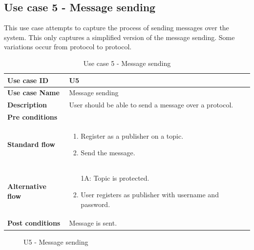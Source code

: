 \subsection{Use case 5 - Message sending}
\label{subsec:requirements_engineering-use_cases-message_sending}

This use case attempts to capture the process of sending messages over the system. This only captures a simplified version of the message sending. Some variations occur from protocol to protocol.

\begin{table}[ht!]
\centering
\begin{tabular}{|l|p{5cm}|}
\hline
\textbf{Use case ID} & U5 \\ \hline
\textbf{Use case Name} & Message sending \\ \hline
\textbf{Description} & User should be able to send a message over a protocol.  \\ \hline
\textbf{Pre conditions} &  \\ \hline
\textbf{Standard flow} & \begin{enumerate}
\item Register as a publisher on a topic.
\item Send the message.
\end{enumerate} \\ \hline
\textbf{Alternative flow} & \begin{enumerate}
\item [1A:] Topic is protected.
\item User registers as publisher with username and password.
\end{enumerate} \\ \hline
\textbf{Post conditions} & Message is sent.  \\ \hline
\end{tabular}
\caption{Use case 5 - Message sending}
\label{uc5}
\end{table}

\begin{center}
  \begin{figure}[ht!]
    \caption{U5 - Message sending}
    \label{fig:u5}
  \end{figure}
\end{center}


